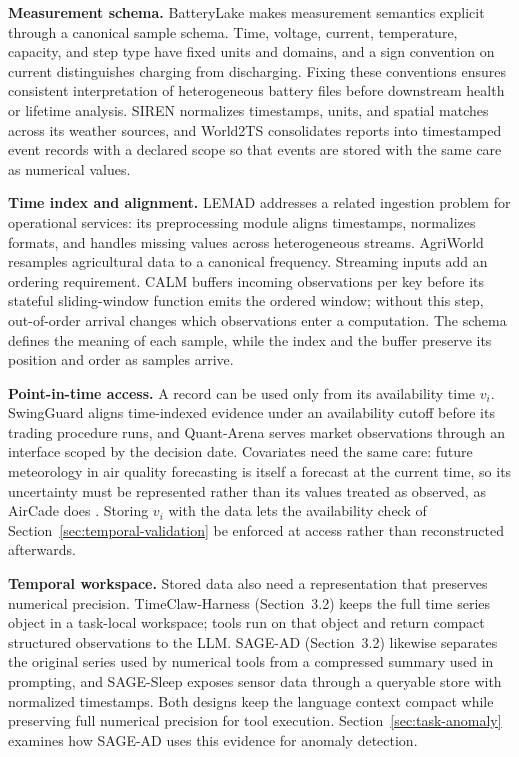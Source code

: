 \documentclass[preprints,article,submit,moreauthors]{Definitions/mdpi}
\begin{document}
\noindent\textbf{Measurement schema.} BatteryLake \citep{batterylake2026} makes measurement semantics explicit through a canonical sample schema. Time, voltage, current, temperature, capacity, and step type have fixed units and domains, and a sign convention on current distinguishes charging from discharging. Fixing these conventions ensures consistent interpretation of heterogeneous battery files before downstream health or lifetime analysis. SIREN \citep{siren2026} normalizes timestamps, units, and spatial matches across its weather sources, and World2TS \citep{world2ts2026} consolidates reports into timestamped event records with a declared scope so that events are stored with the same care as numerical values.

\noindent\textbf{Time index and alignment.} LEMAD \citep{ji2025lemad} addresses a related ingestion problem for operational services: its preprocessing module aligns timestamps, normalizes formats, and handles missing values across heterogeneous streams. AgriWorld \citep{agriworld2026} resamples agricultural data to a canonical frequency. Streaming inputs add an ordering requirement. CALM \citep{calm2025} buffers incoming observations per key before its stateful sliding-window function emits the ordered window; without this step, out-of-order arrival changes which observations enter a computation. The schema defines the meaning of each sample, while the index and the buffer preserve its position and order as samples arrive.

\noindent\textbf{Point-in-time access.} A record can be used only from its availability time $v_i$. SwingGuard \citep{swingguard2026} aligns time-indexed evidence under an availability cutoff before its trading procedure runs, and Quant-Arena \citep{quantarena2026} serves market observations through an interface scoped by the decision date. Covariates need the same care: future meteorology in air quality forecasting is itself a forecast at the current time, so its uncertainty must be represented rather than its values treated as observed, as AirCade does \citep{ma2025spatiotemporal}. Storing $v_i$ with the data lets the availability check of Section~\ref{sec:temporal-validation} be enforced at access rather than reconstructed afterwards.

\noindent\textbf{Temporal workspace.} Stored data also need a representation that preserves numerical precision. TimeClaw-Harness \citep{timeclaw2026harness} (Section~3.2) keeps the full time series object in a task-local workspace; tools run on that object and return compact structured observations to the LLM. SAGE-AD \citep{sagead2026} (Section~3.2) likewise separates the original series used by numerical tools from a compressed summary used in prompting, and SAGE-Sleep \citep{sagesleep2026} exposes sensor data through a queryable store with normalized timestamps. Both designs keep the language context compact while preserving full numerical precision for tool execution. Section~\ref{sec:task-anomaly} examines how SAGE-AD uses this evidence for anomaly detection.
\end{document}
